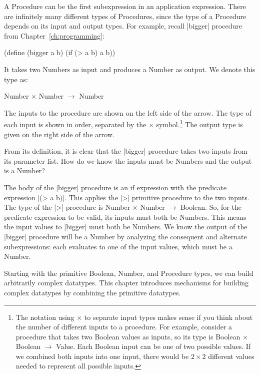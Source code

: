 \begin{schemeregion}
A Procedure can be the first subexpression in an application expression.  There are infinitely many different types of Procedures, since the type of a Procedure depends on its input and output types.  For example, recall \scheme|bigger| procedure from Chapter~\ref{ch:programming}:
\begin{schemedisplay}
(define (bigger a b) (if (> a b) a b))
\end{schemedisplay}
It takes two Numbers as input and produces a Number as output.  We denote this type as:
\begin{center}
Number $\times$ Number $\rightarrow$ Number 
\end{center}
The inputs to the procedure are shown on the left side of the arrow.  The type of each input is shown in order, separated by the $\times$ symbol.\footnote{The notation using $\times$ to separate input types makes sense if you think about the number of different inputs to a procedure.  For example, consider a procedure that takes two Boolean values as inputs, so its type is Boolean $\times$ Boolean $\rightarrow$ Value.  Each Boolean input can be one of two possible values.  If we combined both inputs into one input, there would be $2 \times 2$ different values needed to represent all possible inputs.}  The output type is given on the right side of the arrow.  

From its definition, it is clear that the \scheme|bigger| procedure takes two inputs from its parameter list.  How do we know the inputs must be Numbers and the output is a Number?

The body of the \scheme|bigger| procedure is an if expression with the predicate expression \scheme|(> a b)|.  This applies the \scheme|>| primitive procedure to the two inputs.  The type of the \scheme|>| procedure is Number $\times$ Number $\rightarrow$ Boolean.  So, for the predicate expression to be valid, its inputs must both be Numbers.  This means the input values to \scheme|bigger| must both be Numbers.  We know the output of the \scheme|bigger| procedure will be a Number by analyzing the consequent and alternate subexpressions: each evaluates to one of the input values, which must be a Number.

Starting with the primitive Boolean, Number, and Procedure types, we can build arbitrarily complex datatypes.  This chapter introduces mechanisms for building complex datatypes by combining the primitive datatypes. 


\end{schemeregion}
